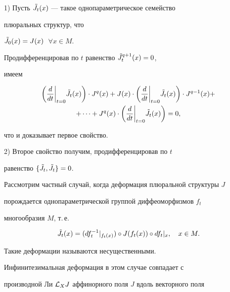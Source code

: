 \begin{pf}


1) Пусть $\Tilde J_{t}(x)$ --- такое однопараметрическое семейство


плюральных структур, что 


$\Tilde J_{0}(x) = J(x)$ $\;\forall x \in M$.


Продифференцировав по $t$ равенство $\Tilde J_{t}^{q+1}(x)=0$,


имеем


\begin{gather*}


\biggl(\biggl.\frac{d}{dt}\biggr|_{t=0} \Tilde J_{t}(x)\biggr) \cdot


J^{q}(x) + J(x) \cdot \biggl(\biggl.\frac{d}{dt}\biggr|_{t=0}


\Tilde J_{t}(x)\biggr) \cdot J^{q-1}(x)+\\


%


+\dotsb +  J^{q}(x) \cdot


\biggl(\biggl.\frac{d}{dt}\biggr|_{t=0} \Tilde J_{t}(x)\biggr)  = 0,


\end{gather*}


что и доказывает первое свойство.





2) Второе свойство получим, продифференцировав по $t$


равенство $\{ \Tilde J_{t}, \Tilde J_{t}\} = 0$.


\end{pf}





Рассмотрим частный случай, когда деформация плюральной структуры $J$


порождается однопараметрической группой диффеоморфизмов $f_{t}$


многообразия $M$, т.\,е.


$$


\Tilde J_{t}(x)=(df_{t}^{-1} \vert _{f_{t}(x)})\circ  %


J(f_{t}(x))\circ df_{t}\vert _{x},\quad  x\in M.


$$


Такие деформации называются несущественными.


Инфинитезимальная деформация в этом случае совпадает с


производной Ли ${\cal L}_X J$ аффинорного поля $J$ вдоль векторного поля


